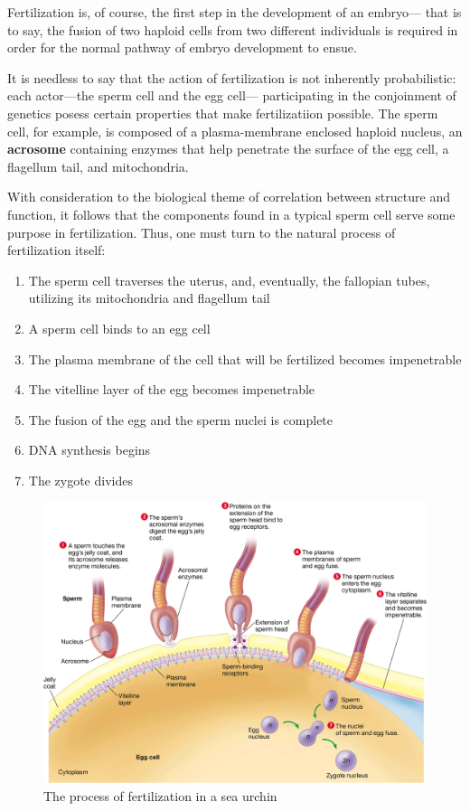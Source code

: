 \documentclass{article}
\begin{document}
Fertilization is, of course, the first step in the development of an embryo---
that is to say, the fusion of two haploid cells from two different individuals
is required in order for the normal pathway of embryo development to ensue.

It is needless to say that the action of fertilization is not inherently
probabilistic: each actor---the sperm cell and the egg cell---
participating in the conjoinment of genetics posess certain properties 
that make fertilizatiion possible. The sperm cell, for example, is
composed of a plasma-membrane enclosed haploid nucleus, an
\textbf{acrosome} containing enzymes that help penetrate the
surface of the egg cell, a flagellum tail, and mitochondria.

With consideration to the biological theme of correlation between structure
and function, it follows that the components found in a typical sperm cell
serve some purpose in fertilization. Thus, one must turn to the natural
process of fertilization itself:

\begin{enumerate}
	\item The sperm cell traverses the uterus, and, eventually, the
		fallopian tubes, utilizing its mitochondria and flagellum tail
	\item A sperm cell binds to an egg cell
	\item The plasma membrane of the cell that will be fertilized becomes
		impenetrable
	\item The vitelline layer of the egg becomes impenetrable
	\item The fusion of the egg and the sperm nuclei is complete
	\item DNA synthesis begins
	\item The zygote divides
\end{enumerate}

\begin{figure}[h]
	\centering
	\includegraphics[width=.65\linewidth]{urchin_fertilization.png}
	\caption{The process of fertilization in a sea urchin}
\end{figure}
\end{document}
